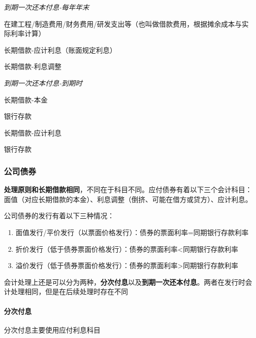 \documentclass[UTF8,12pt]{ctexart}
\newenvironment{Dr}{%
	\begin{list}{}%
		{
			\setlength{\leftmargin}{2em}
			\setlength{\labelwidth}{2em}
			\setlength{\labelsep}{0pt}
			\setlength{\itemindent}{0pt}
			\setlength{\listparindent}{0pt}
			\setlength{\parsep}{0pt}
			\setlength{\topsep}{0pt}
		}
		\item[\textbf{借：}]
	}{%
	\end{list}
}
\newenvironment{Cr}{%
	\begin{list}{}%
		{
			\setlength{\leftmargin}{2em}
			\setlength{\labelwidth}{2em}
			\setlength{\labelsep}{0pt}
			\setlength{\itemindent}{0pt}
			\setlength{\listparindent}{0pt}
			\setlength{\parsep}{0pt}
			\setlength{\topsep}{0pt}
		}
		\item[\textbf{贷：}]
	}{%
	\end{list}
}
\numberwithin{equation}{section} %
\numberwithin{figure}{section}
\numberwithin{table}{section}
\begin{document}
	\textit{到期一次还本付息-每年年末}
	
	\begin{Dr}
		在建工程/制造费用/财务费用/研发支出等（也叫做借款费用，根据摊余成本与实际利率计算）
	\end{Dr}
	\begin{Cr}
		长期借款-应计利息（账面规定利息）
		
		长期借款-利息调整
	\end{Cr}

	\textit{到期一次还本付息-到期时}
	
	\begin{Dr}
		长期借款-本金
	\end{Dr}
	\begin{Cr}
		银行存款
	\end{Cr}

	\begin{Dr}
		长期借款-应计利息
	\end{Dr}
	\begin{Cr}
		银行存款
	\end{Cr}
	
	\subsubsection{公司债券}
	\textbf{处理原则和长期借款相同}，不同在于科目不同。应付债券有着以下三个会计科目：面值（对应长期借款的本金）、利息调整（倒挤、可能在借方或贷方）、应计利息。
	
	公司债券的发行有着以下三种情况：
	
	\begin{enumerate}
		\item 面值发行/平价发行（以票面价格发行）：债券的票面利率=同期银行存款利率
		
		\item 折价发行（低于债券票面价格发行）：债券的票面利率<同期银行存款利率
		
		\item 溢价发行（低于债券票面价格发行）：债券的票面利率>同期银行存款利率
	\end{enumerate}

	会计处理上还是可以分为两种，\textbf{分次付息}以及\textbf{到期一次还本付息}。两者在发行时会计处理相同，但是在后续处理时存在不同
	
	\paragraph{分次付息} 分次付息主要使用应付利息科目
	
\end{document}
